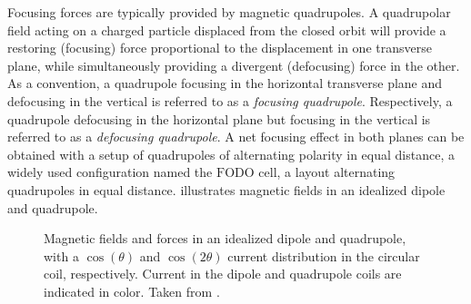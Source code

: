 Focusing forces are typically provided by magnetic quadrupoles.
A quadrupolar field acting on a charged particle displaced from the closed orbit will provide a restoring (focusing) force proportional to the displacement in one transverse plane, while simultaneously providing a divergent (defocusing) force in the other. 
As a convention, a quadrupole focusing in the horizontal transverse plane and defocusing in the vertical is referred to as a \emph{focusing quadrupole}. 
Respectively, a quadrupole defocusing in the horizontal plane but focusing in the vertical is referred to as a \emph{defocusing quadrupole}.
A net focusing effect in both planes can be obtained with a setup of quadrupoles of alternating polarity in equal distance, a widely used configuration named the $\mathrm{FODO}$ cell, a layout alternating quadrupoles in equal distance.
 illustrates magnetic fields in an idealized dipole and quadrupole.
\bigbreak

\begin{figure}[htp]
    \centering
    \hspace{0.5cm}
    \caption{Magnetic fields and forces in an idealized dipole and quadrupole, with a \(\cos(\theta)\) and \(\cos(2\theta)\) current distribution in the circular coil, respectively. Current in the dipole and quadrupole coils are indicated in color. Taken from \cite{CERN:Russenschuck:CAS_Design_Magnets}.}
    \label{figure:dipole_quadrupole_fields}
\end{figure}

